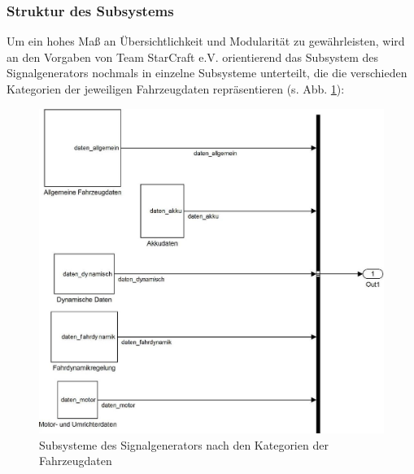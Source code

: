 \documentclass[fontsize = 12pt, paper = a4]{scrreprt}
\begin{document}
\newpage

\subsubsection{Struktur des Subsystems}

Um ein hohes Maß an Übersichtlichkeit und Modularität zu gewährleisten, wird an den Vorgaben von Team StarCraft e.V. orientierend das Subsystem des Signalgenerators nochmals in einzelne Subsysteme unterteilt, die die verschieden Kategorien der jeweiligen Fahrzeugdaten repräsentieren (s. Abb. \ref{Subsysteme}): \\

\begin{figure}[h]
\centering
\includegraphics[scale = 0.85]{signalgen}
\caption[Subsysteme des Signalgenerators]
{Subsysteme des Signalgenerators nach den Kategorien der Fahrzeugdaten}
\label{Subsysteme}
\end{figure}

\newpage
\end{document}
